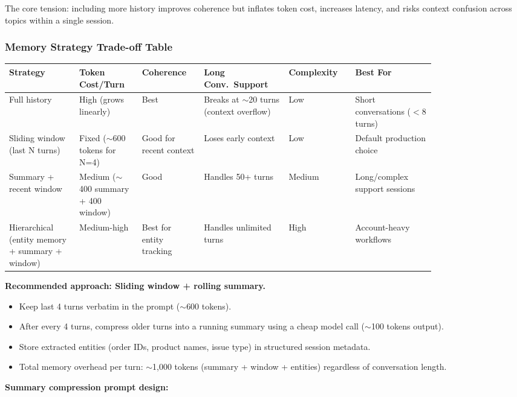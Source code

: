 The core tension: including more history improves coherence but inflates token cost, increases latency, and risks context confusion across topics within a single session.

\subsubsection*{Memory Strategy Trade-off Table}

\small
\begin{tabular}{|p{0.14\linewidth}|p{0.12\linewidth}|p{0.12\linewidth}|p{0.16\linewidth}|p{0.12\linewidth}|p{0.16\linewidth}|}
\hline
\textbf{Strategy} & \textbf{Token Cost/Turn} & \textbf{Coherence} & \textbf{Long Conv.\ Support} & \textbf{Complexity} & \textbf{Best For} \\
\hline
Full history & High (grows linearly) & Best & Breaks at $\sim$20 turns (context overflow) & Low & Short conversations ($<$8 turns) \\
\hline
Sliding window (last N turns) & Fixed ($\sim$600 tokens for N=4) & Good for recent context & Loses early context & Low & Default production choice \\
\hline
Summary + recent window & Medium ($\sim$400 summary + 400 window) & Good & Handles 50+ turns & Medium & Long/complex support sessions \\
\hline
Hierarchical (entity memory + summary + window) & Medium-high & Best for entity tracking & Handles unlimited turns & High & Account-heavy workflows \\
\hline
\end{tabular}
\normalsize

\textbf{Recommended approach: Sliding window + rolling summary.}

\begin{itemize}
  \item Keep last 4 turns verbatim in the prompt ($\sim$600 tokens).
  \item After every 4 turns, compress older turns into a running summary using a cheap model call ($\sim$100 tokens output).
  \item Store extracted entities (order IDs, product names, issue type) in structured session metadata.
  \item Total memory overhead per turn: $\sim$1,000 tokens (summary + window + entities) regardless of conversation length.
\end{itemize}

\textbf{Summary compression prompt design:}

